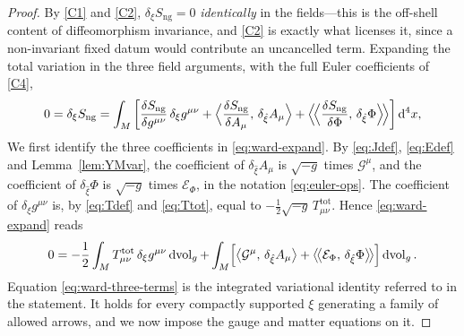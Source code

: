 \documentclass[11pt,a4paper]{article}
\theoremstyle{plain}
\theoremstyle{definition}
\theoremstyle{remark}
\newcommand{\dvol}{\mathrm{d}\!\operatorname{vol}_g}
\begin{document}
\begin{proof}
By \ref{C1} and \ref{C2}, $\delta_\xi S_{\mathrm{ng}}=0$ \emph{identically} in the fields---this is
the off-shell content of diffeomorphism invariance, and \ref{C2} is exactly what licenses it, since
a non-invariant fixed datum would contribute an uncancelled term. Expanding the total variation in
the three field arguments, with the full Euler coefficients of \ref{C4},
\begin{equation}
\label{eq:ward-expand}
0=\delta_\xi S_{\mathrm{ng}}
=\int_M\left[
\frac{\delta S_{\mathrm{ng}}}{\delta g^{\mu\nu}}\,\delta_\xi g^{\mu\nu}
+\Bigl\langle \frac{\delta S_{\mathrm{ng}}}{\delta A_\mu},\,\delta_{\hat\xi} A_\mu\Bigr\rangle
+\Bigl\langle\!\Bigl\langle \frac{\delta S_{\mathrm{ng}}}{\delta \Phi},\,\delta_{\hat\xi} \Phi
\Bigr\rangle\!\Bigr\rangle
\right]\mathrm{d}^4x ,
\end{equation}
We first identify the three coefficients in \eqref{eq:ward-expand}. By \eqref{eq:Jdef},
\eqref{eq:Edef} and Lemma~\ref{lem:YMvar}, the coefficient of $\delta_{\hat\xi} A_\mu$ is $\sqrt{-g}$
times $\mathcal{G}^{\mu}$, and the coefficient of $\delta_{\hat\xi}\Phi$ is $\sqrt{-g}$ times
$\mathcal{E}_\Phi$, in the notation \eqref{eq:euler-ops}. The coefficient of $\delta_\xi g^{\mu\nu}$
is, by \eqref{eq:Tdef} and \eqref{eq:Ttot}, equal to $-\tfrac12\sqrt{-g}\,T^{\mathrm{tot}}_{\mu\nu}$.
Hence \eqref{eq:ward-expand} reads
\begin{equation}
\label{eq:ward-three-terms}
0=
-\frac12\int_M T^{\mathrm{tot}}_{\mu\nu}\,\delta_\xi g^{\mu\nu}\,\dvol
+\int_M\Bigl[
\bigl\langle \mathcal{G}^{\mu},\,\delta_{\hat\xi}A_\mu\bigr\rangle
+\bigl\langle\!\bigl\langle \mathcal{E}_\Phi,\,\delta_{\hat\xi}\Phi\bigr\rangle\!\bigr\rangle
\Bigr]\,\dvol .
\end{equation}
Equation \eqref{eq:ward-three-terms} is the integrated variational identity referred to in the
statement. It holds for every compactly supported $\xi$ generating a family of allowed arrows, and
we now impose the gauge and matter equations on it.


\end{proof}
\end{document}
